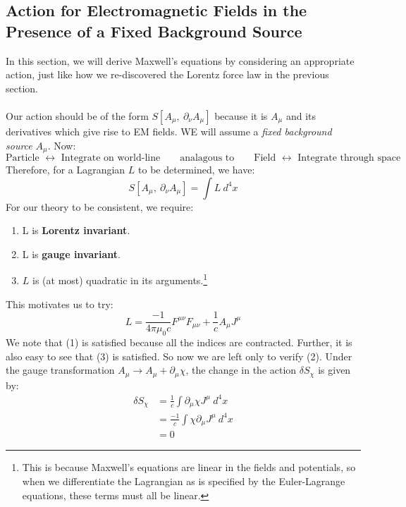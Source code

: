 \documentclass[a4paper]{article}
\numberwithin{equation}{section}
\begin{document}
\subsection{Action for Electromagnetic Fields in the Presence of a Fixed Background Source}
In this section, we will derive Maxwell's equations by considering an appropriate action, just like how we re-discovered the Lorentz force law in the previous section.\\
\\
Our action should be of the form $S[A_\mu, \ \partial_\nu A_\mu]$ because it is $A_\mu$ and its derivatives which give rise to EM fields. WE will assume a \textit{fixed background source} $A_\mu$. Now:
\begin{equation*}
\text{Particle } \leftrightarrow \text{ Integrate on world-line} \qquad \text{analagous to} \qquad
\text{Field } \leftrightarrow \text{ Integrate through space}
\end{equation*}
Therefore, for a Lagrangian $L$ to be determined, we have:
\begin{equation}
S[A_\mu, \ \partial_\nu A_\mu] = \int L \ d^4x
\end{equation}
For our theory to be consistent, we require:
\begin{enumerate}[(1)]
\item 
L is \textbf{Lorentz invariant}.
\item 
L is \textbf{gauge invariant}.
\item 
$L$ is (at most) quadratic in its arguments.\footnote{This is because Maxwell's equations are linear in the fields and potentials, so when we differentiate the Lagrangian as is specified by the Euler-Lagrange equations, these terms must all be linear.}
\end{enumerate}
This motivates us to try:
\begin{equation}
L=\frac{-1}{4 \pi \mu_0 c}F^{\mu \nu}F_{\mu \nu} + \frac{1}{c}A_\mu J^\mu
\end{equation}
We note that (1) is satisfied because all the indices are contracted. Further, it is also easy to see that (3) is satisfied. So now we are left only to verify (2). Under the gauge transformation $A_\mu \rightarrow A_\mu + \partial_\mu \chi$, the change in the action $\delta S_\chi$ is given by:
\begin{align*}
\delta S_\chi &= \frac{1}{c} \int \partial _\mu \chi J^\mu \ d^4 x \\
&=\frac{-1}{c} \int \chi \partial_\mu J^\mu \ d^4x \\
&=0
\end{align*}
\end{document}
